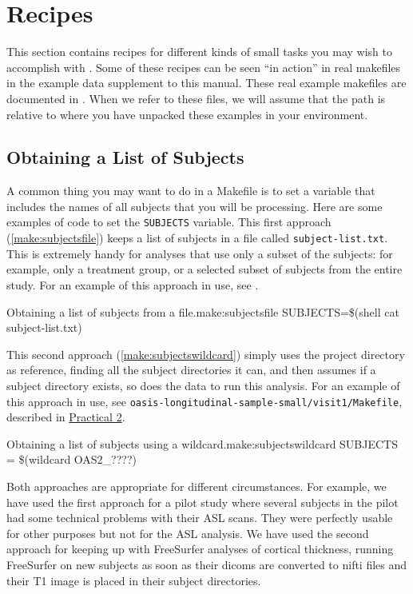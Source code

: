 \chapter{Recipes}
\label{sec:recipes}

This section contains recipes for different kinds of small tasks you may wish to accomplish with \maken{}. Some of these recipes can be seen ``in action'' in real makefiles in the example data supplement to this manual. These real example makefiles are documented in . When we refer to these files, we will assume that the path is relative to where you have unpacked these examples in your environment. 

\section{Obtaining a List of Subjects}
\label{subsec:subjectlist}

A common thing you may want to do in a Makefile is to set a variable that includes the names of all subjects that you will be processing. Here are some examples of code to set the \texttt{SUBJECTS} variable. This first approach (\autoref{make:subjectsfile}) keeps a list of subjects in a file called \texttt{subject-list.txt}. 
This is extremely handy for analyses that use only a subset of the subjects: for example, only a treatment group, or a selected subset of subjects from the entire study. For an example of this approach in use, see . 

\begin{make}{Obtaining a list of subjects from a file.}{make:subjectsfile}
SUBJECTS=\$(shell cat subject-list.txt) 
\end{make}


This second approach (\autoref{make:subjectswildcard}) simply uses the project directory as reference, finding all the subject directories it can, and then assumes if a subject directory exists, so does the data to run this analysis. For an example of this approach in use, see \texttt{oasis-longitudinal-sample-small/visit1/Makefile}, described in \hyperref[sec:practicum2]{Practical 2}. 

\begin{make}{Obtaining a list of subjects using a wildcard.}{make:subjectswildcard}
SUBJECTS = \$(wildcard OAS2\_????)
\end{make}

Both approaches are appropriate for different circumstances. For example, we have used the first approach for a pilot study where several subjects in the pilot had some technical problems with their ASL scans. They were perfectly usable for other purposes but not for the ASL analysis. We have used the second approach for keeping up with FreeSurfer analyses of cortical thickness, running FreeSurfer on new subjects as soon as their dicoms are converted to nifti files and their T1 image is placed in their subject directories.  


